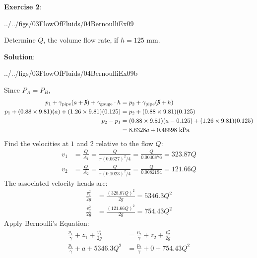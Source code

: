 \documentclass[10pt]{amsart}
\begin{document}
\begin{minipage}[t]{0.48\textwidth}
	\raggedright
	\textbf{Exercise 2}:\\
	\begin{cfig}[0.2]{../../figs/03FlowOfFluids/04BernoulliEx09}\end{cfig}
	Determine $Q$, the volume flow rate, if $h=125$ mm.
\end{minipage}
\hfill
\begin{minipage}[t]{0.48\textwidth}
	\parb
	\vspace{-0.75cm}
	\textbf{Solution}:
	\begin{cfig}[0.225]{../../figs/03FlowOfFluids/04BernoulliEx09b}\end{cfig}
\end{minipage}\parb
\begin{minipage}[t]{0.85\textwidth}
	\parb
	Since $P_A=P_B$,
	\begin{align*}
		p_{1}+\gamma_\text{pipe}(a+\cancel{b}) + \gamma_\text{gauge}\cdot h & =  p_{2}+\gamma_\text{pipe}(\cancel{b} + h)         \\
		p_{1}+(0.88\times9.81)(a) + (1.26\times9.81)(0.125)                 & =  p_{2}+(0.88\times9.81)(0.125)                    \\
		p_{2}-p_{1}                                                         & = (0.88\times9.81)(a-0.125)+(1.26\times9.81)(0.125) \\
		                                                                    & = 8.6328a+0.46598\text{ kPa}                        
	\end{align*}
	Find the velocities at $1$ and $2$ relative to the flow $Q$:
	\begin{align*}
		v_1 & = \frac{Q}{A_1} = \frac{Q}{\pi(0.0627)^2/4}=\frac{Q}{0.0030876}=323.87Q \\
		v_2 & = \frac{Q}{A_2} = \frac{Q}{\pi(0.1023)^2/4}=\frac{Q}{0.0082194}=121.66Q 
	\end{align*}
	The associated velocity heads are:
	\begin{align*}
		\frac{v_1^2}{2g} & = \frac{(328.87Q)^2}{2g} = 5346.3Q^2 \\
		\frac{v_2^2}{2g} & = \frac{(121.66Q)^2}{2g} =754.43Q^2  
	\end{align*}
	Apply Bernoulli's Equation:
	\begin{align*}
		\frac{p_1}{\gamma} + z_1 + \frac{v_1^2}{2g} & = \frac{p_2}{\gamma} + z_2 + \frac{v_2^2}{2g} \\
		\frac{p_1}{\gamma} + a + 5346.3Q^2          & = \frac{p_2}{\gamma} + 0 + 754.43Q^2          \\

\end{align*}
\end{minipage}
\end{document}

